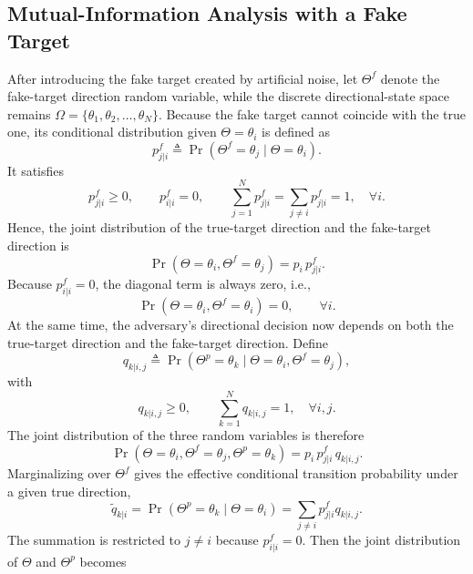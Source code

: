 \documentclass[conference,twocolumn,a4paper]{IEEEtran}
\begin{document}
\subsection{Mutual-Information Analysis with a Fake Target}
After introducing the fake target created by artificial noise, let $\Theta^f$ denote the fake-target direction random variable, while the discrete directional-state space remains $\Omega=\{\theta_1,\theta_2,\dots,\theta_N\}$. Because the fake target cannot coincide with the true one, its conditional distribution given $\Theta=\theta_i$ is defined as
\begin{equation}
p_{j|i}^{f}\triangleq\Pr(\Theta^f=\theta_j\mid \Theta=\theta_i).
\end{equation}
It satisfies
\begin{equation}
p_{j|i}^{f}\ge 0,\qquad p_{i|i}^{f}=0,\qquad \sum_{j=1}^{N}p_{j|i}^{f}=\sum_{j\neq i}p_{j|i}^{f}=1,\quad \forall i.
\end{equation}
Hence, the joint distribution of the true-target direction and the fake-target direction is
\begin{equation}
\Pr(\Theta=\theta_i,\Theta^f=\theta_j)=p_i\,p_{j|i}^{f}.
\end{equation}
Because $p_{i|i}^{f}=0$, the diagonal term is always zero, i.e.,
\begin{equation}
\Pr(\Theta=\theta_i,\Theta^f=\theta_i)=0,\qquad \forall i.
\end{equation}
At the same time, the adversary's directional decision now depends on both the true-target direction and the fake-target direction. Define
\begin{equation}
q_{k|i,j}\triangleq\Pr(\Theta^p=\theta_k\mid \Theta=\theta_i,\Theta^f=\theta_j),
\end{equation}
with
\begin{equation}
q_{k|i,j}\ge 0,\qquad \sum_{k=1}^{N}q_{k|i,j}=1,\quad \forall i,j.
\end{equation}
The joint distribution of the three random variables is therefore
\begin{equation}
\Pr(\Theta=\theta_i,\Theta^f=\theta_j,\Theta^p=\theta_k)=p_i\,p_{j|i}^{f}\,q_{k|i,j}.
\end{equation}
Marginalizing over $\Theta^f$ gives the effective conditional transition probability under a given true direction,
\begin{equation}
\widetilde q_{k|i}
=\Pr(\Theta^p=\theta_k\mid\Theta=\theta_i)
=\sum_{j\neq i} p_{j|i}^{f} q_{k|i,j}.
\end{equation}
The summation is restricted to $j\neq i$ because $p_{i|i}^{f}=0$. Then the joint distribution of $\Theta$ and $\Theta^p$ becomes
\end{document}
